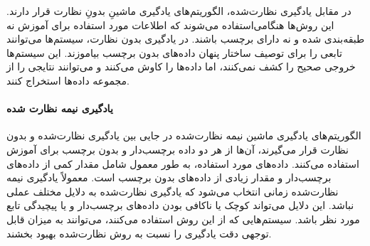 در مقابل  یادگیری نظارت‌شده، الگوریتم‌های یادگیری ماشینِ بدونِ نظارت قرار دارند. این روش‌ها هنگامی‌استفاده می‌شوند که اطلاعات مورد استفاده برای آموزش نه طبقه‌بندی شده و نه دارای برچسب باشند. در یادگیری بدون نظارت، سیستم‌ها می‌توانند تابعی را برای توصیف ساختار پنهان داده‌های بدون برچسب بیاموزند. این سیستم‌ها خروجی صحیح را کشف نمی‌کنند، اما داده‌ها را کاوش می‌کنند و می‌توانند نتایجی را از مجموعه داده‌ها استخراج کنند.


\paragraph{یادگیری نیمه نظارت شده}

الگوریتم‌های یادگیری ماشین نیمه نظارت‌شده در جایی بین یادگیری نظارت‌شده و بدون نظارت قرار می‌گیرند، آن‌ها از هر دو داده برچسب‌دار و بدون برچسب برای آموزش استفاده می‌کنند. داده‌های مورد استفاده، به طور معمول شامل مقدار کمی از داده‌های برچسب‌دار و مقدار زیادی از داده‌های بدون برچسب است. معمولاً یادگیری نیمه نظارت‌شده زمانی انتخاب می‌شود که یادگیری نظارت‌شده به دلایل مختلف عملی نباشد. این دلایل می‌تواند کوچک یا ناکافی بودن داده‌های برچسب‌دار و یا پیچیدگی تابع مورد نظر باشد. سیستم‌هایی که از این روش استفاده می‌کنند، می‌توانند به میزان قابل توجهی دقت یادگیری را نسبت به روش نظارت‌شده بهبود بخشند. 

